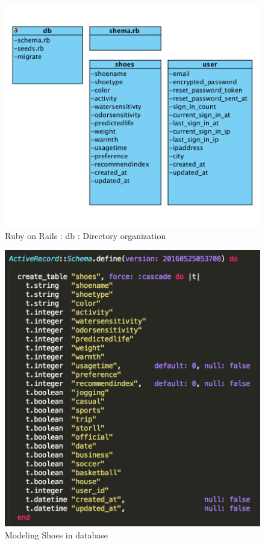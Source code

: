 \documentclass[conference]{IEEEtran}
\begin{document}
\begin{figure}[H]
\begin{center}
    \includegraphics[scale=0.55]{db}
  \caption{Ruby on Rails : db : Directory organization}\label{fig:label}
\end{center}
\end{figure}
\begin{figure}[H]
\begin{center}
    \includegraphics[scale=0.52]{schemashoes}
  \caption{Modeling Shoes in database}\label{fig:label}
\end{center}
\end{figure}
\end{document}
